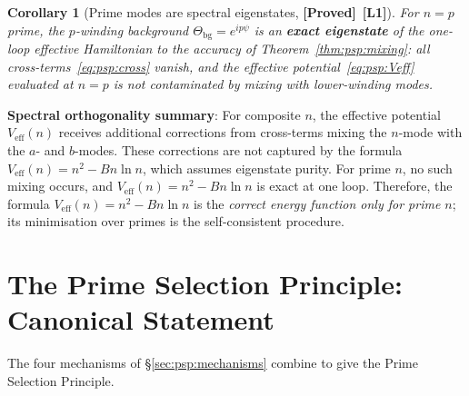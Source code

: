 \documentclass[12pt,a4paper]{article}
\newtheorem{corollary}[theorem]{Corollary}
\theoremstyle{definition}
\theoremstyle{remark}
\newcommand{\PROVED}{\textbf{[Proved]}}
\newcommand{\Lone}{\textbf{[L1]}}
\begin{document}
\begin{corollary}[Prime modes are spectral eigenstates, \PROVED\ \Lone]
\label{cor:psp:eigenstates}
For $n = p$ prime, the $p$-winding background $\Theta_{\mathrm{bg}} = e^{ip\psi}$
is an \textbf{exact eigenstate} of the one-loop effective Hamiltonian to the
accuracy of Theorem~\ref{thm:psp:mixing}: all cross-terms~\eqref{eq:psp:cross}
vanish, and the effective potential~\eqref{eq:psp:Veff} evaluated at $n = p$ is
not contaminated by mixing with lower-winding modes.
\end{corollary}

\begin{infobox}
\textbf{Spectral orthogonality summary}: For composite $n$, the effective potential
$V_{\mathrm{eff}}(n)$ receives additional corrections from cross-terms mixing the
$n$-mode with the $a$- and $b$-modes.  These corrections are not captured by
the formula $V_{\mathrm{eff}}(n) = n^2 - Bn\ln n$, which assumes eigenstate
purity.  For prime $n$, no such mixing occurs, and $V_{\mathrm{eff}}(n) = n^2 - Bn\ln n$
is exact at one loop.
Therefore, the formula $V_{\mathrm{eff}}(n) = n^2 - Bn\ln n$ is the
\emph{correct energy function only for prime $n$}; its minimisation over primes
is the self-consistent procedure.
\end{infobox}

\section{The Prime Selection Principle: Canonical Statement}
\label{sec:psp:statement}

The four mechanisms of §\ref{sec:psp:mechanisms} combine to give the
Prime Selection Principle.
\end{document}
